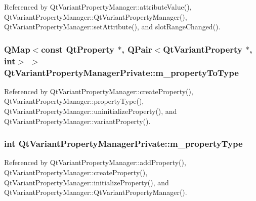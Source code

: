 Referenced by Qt\+Variant\+Property\+Manager\+::attribute\+Value(), Qt\+Variant\+Property\+Manager\+::\+Qt\+Variant\+Property\+Manager(), Qt\+Variant\+Property\+Manager\+::set\+Attribute(), and slot\+Range\+Changed().

\subsubsection[{m\+\_\+property\+To\+Type}]{\setlength{\rightskip}{0pt plus 5cm}Q\+Map$<$const {\bf Qt\+Property} $\ast$, Q\+Pair$<${\bf Qt\+Variant\+Property} $\ast$, int$>$ $>$ Qt\+Variant\+Property\+Manager\+Private\+::m\+\_\+property\+To\+Type}\label{classQtVariantPropertyManagerPrivate_a51dac0bf79740cce4fcbf4c1d43d4b77}


Referenced by Qt\+Variant\+Property\+Manager\+::create\+Property(), Qt\+Variant\+Property\+Manager\+::property\+Type(), Qt\+Variant\+Property\+Manager\+::uninitialize\+Property(), and Qt\+Variant\+Property\+Manager\+::variant\+Property().

\subsubsection[{m\+\_\+property\+Type}]{\setlength{\rightskip}{0pt plus 5cm}int Qt\+Variant\+Property\+Manager\+Private\+::m\+\_\+property\+Type}\label{classQtVariantPropertyManagerPrivate_a24d56a86419e9324e6d11b4ffbdf1989}


Referenced by Qt\+Variant\+Property\+Manager\+::add\+Property(), Qt\+Variant\+Property\+Manager\+::create\+Property(), Qt\+Variant\+Property\+Manager\+::initialize\+Property(), and Qt\+Variant\+Property\+Manager\+::\+Qt\+Variant\+Property\+Manager().

